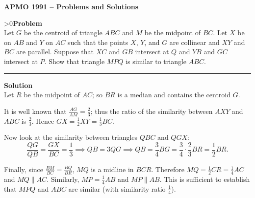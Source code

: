 \documentclass[12pt,oneside,a4paper]{book}
\newcounter{probnum}
\newcounter{solnum}
\newcommand{\prob}{\ifnum\value{probnum}>0\newpage\fi\setcounter{solnum}{0}\stepcounter{probnum}\textbf{Problem \theprobnum}\\}
\newcommand{\soln}{\stepcounter{solnum}\medskip\hrule\medbreak\textbf{Solution \thesolnum}\\}
\begin{document}
\begin{center}
\textbf{\large APMO 1991 -- Problems and Solutions}
\end{center}

\prob Let $G$ be the centroid of triangle $ABC$ and $M$ be the midpoint of $BC$. Let $X$ be on $AB$ and $Y$ on $AC$ such that the points $X$, $Y$, and $G$ are collinear and $XY$ and $BC$ are parallel. Suppose that $XC$ and $GB$ intersect at $Q$ and $YB$ and $GC$ intersect at $P$. Show that triangle $MPQ$ is similar to triangle $ABC$.

\soln
Let $R$ be the midpoint of $AC$; so $BR$ is a median and contains the centroid $G$.

\begin{center}
\end{center}

It is well known that $\frac{AG}{AM} = \frac23$; thus the ratio of the similarity between $AXY$ and $ABC$ is $\frac23$. Hence $GX = \frac12XY = \frac 13BC$.

Now look at the similarity between triangles $QBC$ and $QGX$:
\[\frac{QG}{QB} = \frac{GX}{BC} = \frac13 \implies QB = 3QG \implies QB = \frac34BG = \frac34\cdot\frac23BR = \frac12BR.\]

Finally, since $\frac{BM}{BC} = \frac{BQ}{BR}$, $MQ$ is a midline in $BCR$. Therefore $MQ = \frac12CR = \frac14AC$ and $MQ\parallel AC$. Similarly, $MP = \frac14AB$ and $MP\parallel AB$. This is sufficient to establish that $MPQ$ and $ABC$ are similar (with similarity ratio $\frac14$).
\end{document}
